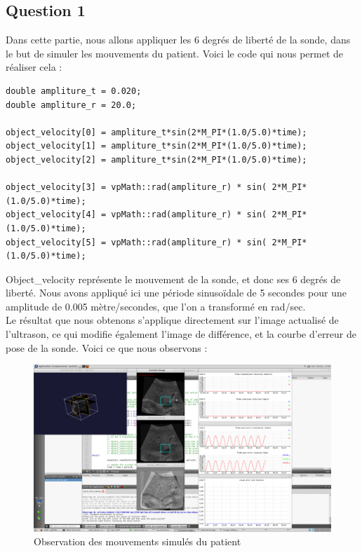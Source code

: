 \documentclass[a4paper,11pt]{article}
\begin{document}
\subsection{Question 1}
Dans cette partie, nous allons appliquer les 6 degr\'es de libert\'e de la sonde, dans le but de simuler les mouvements du patient. Voici le code qui nous permet de r\'ealiser cela :
\begin{verbatim}
double ampliture_t = 0.020;
double ampliture_r = 20.0;

object_velocity[0] = ampliture_t*sin(2*M_PI*(1.0/5.0)*time);
object_velocity[1] = ampliture_t*sin(2*M_PI*(1.0/5.0)*time);
object_velocity[2] = ampliture_t*sin(2*M_PI*(1.0/5.0)*time);

object_velocity[3] = vpMath::rad(ampliture_r) * sin( 2*M_PI*(1.0/5.0)*time);
object_velocity[4] = vpMath::rad(ampliture_r) * sin( 2*M_PI*(1.0/5.0)*time);
object_velocity[5] = vpMath::rad(ampliture_r) * sin( 2*M_PI*(1.0/5.0)*time);
\end{verbatim}

Object\_velocity repr\'esente le mouvement de la sonde, et donc ses 6 degr\'es de libert\'e. Nous avons appliqu\'e ici une p\'eriode sinuso\"idale de 5 secondes pour une amplitude de 0.005 m\`etre/secondes, que l'on a transform\'e en rad/sec.\\

Le r\'esultat que nous obtenons s'applique directement sur l'image actualis\'e de l'ultrason, ce qui modifie \'egalement l'image de diff\'erence, et la courbe d'erreur de pose de la sonde. Voici ce que nous observons :
\begin{figure}[!h]
	\centering
		\includegraphics[width=1.0\textwidth]{./images/question1.png}
	\caption{Observation des mouvements simul\'es du patient}
	\label{mvtPatient}
\end{figure}
\end{document}
